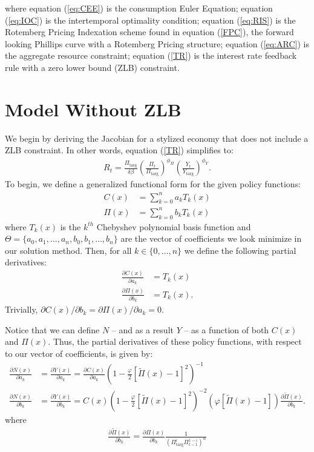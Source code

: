 \documentclass[11pt]{article}
\begin{document}
\noindent where equation (\ref{eq:CEE}) is the consumption Euler Equation; equation (\ref{eq:IOC}) is the intertemporal optimality condition; equation (\ref{eq:RIS}) is the Rotemberg Pricing Indexation scheme found in equation (\ref{FPC}), the forward looking Phillips curve with a Rotemberg Pricing structure; equation (\ref{eq:ARC}) is the aggregate resource constraint; equation (\ref{TR}) is the interest rate feedback rule with a zero lower bound (ZLB) constraint.

\section{Model Without ZLB}
We begin by deriving the Jacobian for a stylized economy that does not include a ZLB constraint. In other words, equation (\ref{TR}) simplifies to: 
\begin{align}
	R_{t} = \frac{\Pi_{\text{targ}}}{\delta\beta}\left(\frac{\Pi_{t}}{\Pi_{\text{targ}}}\right)^{\phi_{\Pi}}\left(\frac{Y_{t}}{Y_{\text{targ}}}\right)^{\phi_{Y}}. \label{TR_NZLB}	
\end{align}
To begin, we define a generalized functional form for the given policy functions:
\begin{align}
	C(x) &= \sum_{k=0}^{n}a_kT_k(x) \\ 
	\Pi(x) &= \sum_{k=0}^{n}b_kT_k(x)
\end{align}
where $T_k(x)$ is the $k^{th}$ Chebyshev polynomial basis function and $\Theta = \{a_0,a_1,\dots,a_n,b_0,b_1,\dots,b_n\}$ are the vector of coefficients we look minimize in our solution method. Then, for all $k\in\{0,\dots,n\}$ we define the following partial derivatives: 
\begin{align}
\frac{\partial C(x)}{\partial a_k} &= T_k(x) \\ 
\frac{\partial \Pi(x)}{\partial b_k} &= T_k(x).
\end{align}
Trivially, $\partial C(x)/\partial b_k = \partial \Pi(x)/\partial a_k = 0$. 

Notice that we can define $N$ -- and as a result $Y$ --  as a function of both $C(x)$ and $\Pi(x)$. Thus, the partial derivatives of these policy functions, with respect to our vector of coefficients, is given by: 
\begin{align}
\frac{\partial N(x)}{\partial a_k} &= \frac{\partial Y(x)}{\partial a_k} = \frac{\partial C(x)}{\partial a_k}\left(1-\frac{\varphi}{2}\left[\tilde{\Pi}(x) -1\right]^2\right)^{-1}\\ 
\frac{\partial N(x)}{\partial b_k} &= \frac{\partial Y(x)}{\partial b_k} = C(x)\left(1-\frac{\varphi}{2}\left[\tilde{\Pi}(x) -1\right]^2\right)^{-2}\left(\varphi\left[\tilde{\Pi}(x) -1\right]\right)\frac{\partial \tilde{\Pi}(x)}{\partial b_k}.
\end{align}
where 
\begin{align}
	\frac{\partial \tilde{\Pi}(x)}{\partial b_k} = \frac{\partial \Pi(x)}{\partial b_k}\frac{1}{\left(\Pi_{\text{targ}}^{\iota}\Pi_{t-1}^{1-\iota}\right)^{\alpha}}
\end{align}
\end{document}
